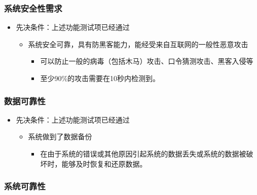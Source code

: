 \documentclass[hyperref, a4paper]{ctexart}
\providecommand{\tightlist}{%
  \setlength{\itemsep}{0pt}\setlength{\parskip}{0pt}}
\begin{document}
\hypertarget{ux7cfbux7edfux5b89ux5168ux6027ux9700ux6c42}{%
\subsubsection{系统安全性需求}\label{ux7cfbux7edfux5b89ux5168ux6027ux9700ux6c42}}

\begin{itemize}
\tightlist
\item
  先决条件：上述功能测试项已经通过

  \begin{itemize}
  \tightlist
  \item
    系统安全可靠，具有防黑客能力，能经受来自互联网的一般性恶意攻击

    \begin{itemize}
    \tightlist
    \item
      可以防止一般的病毒（包括木马）攻击、口令猜测攻击、黑客入侵等
    \item
      至少90\%的攻击需要在10秒内检测到。
    \end{itemize}
  \end{itemize}
\end{itemize}

\hypertarget{ux6570ux636eux53efux9760ux6027}{%
\subsubsection{数据可靠性}\label{ux6570ux636eux53efux9760ux6027}}

\begin{itemize}
\tightlist
\item
  先决条件：上述功能测试项已经通过

  \begin{itemize}
  \tightlist
  \item
    系统做到了数据备份

    \begin{itemize}
    \tightlist
    \item
      在由于系统的错误或其他原因引起系统的数据丢失或系统的数据被破坏时，能够及时恢复和还原数据。
    \end{itemize}
  \end{itemize}
\end{itemize}

\hypertarget{ux7cfbux7edfux53efux9760ux6027}{%
\subsubsection{系统可靠性}\label{ux7cfbux7edfux53efux9760ux6027}}
\end{document}
